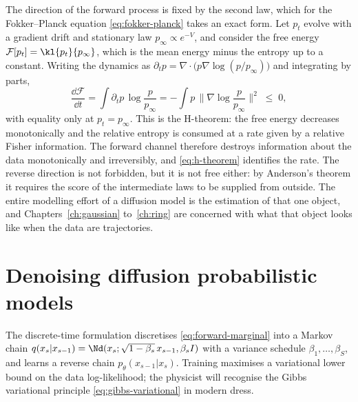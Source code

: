 The direction of the forward process is fixed by the second law, which for the
Fokker--Planck equation \eqref{eq:fokker-planck} takes an exact form. Let $p_t$
evolve with a gradient drift and stationary law $p_\infty \propto e^{-V}$, and
consider the free energy $\mathcal F[p_t] = \kl{p_t}{p_\infty}$, which is the
mean energy minus the entropy up to a constant. Writing the dynamics as
$\partial_t p = \nabla \cdot \big(p \nabla \log (p/p_\infty)\big)$ and
integrating by parts,
\begin{equation}
  \frac{\dd \mathcal F}{\dd t}
  = \int \partial_t p \, \log \frac{p}{p_\infty}
  = -\int p \,\Big\| \nabla \log \frac{p}{p_\infty} \Big\|^2 \;\le\; 0 ,
  \label{eq:h-theorem}
\end{equation}
with equality only at $p_t = p_\infty$. This is the H-theorem: the free energy
decreases monotonically and the relative entropy is consumed at a rate given by
a relative Fisher information. The forward channel therefore destroys
information about the data monotonically and irreversibly, and
\eqref{eq:h-theorem} identifies the rate. The reverse direction is not
forbidden, but it is not free either: by Anderson's theorem it requires the
score of the intermediate laws to be supplied from outside. The entire
modelling effort of a diffusion model is the estimation of that one object, and
Chapters~\ref{ch:gaussian} to~\ref{ch:ring} are concerned with what that object
looks like when the data are trajectories.

\section{Denoising diffusion probabilistic models}\label{sec:ddpm}

The discrete-time formulation \citep{sohl2015deep, ho2020denoising}
discretises \eqref{eq:forward-marginal} into a Markov chain
$q(x_s | x_{s-1}) = \Nd(x_s; \sqrt{1 - \beta_s}\, x_{s-1}, \beta_s I)$
with a variance schedule $\beta_1, \dots, \beta_S$, and learns a reverse
chain $p_\theta(x_{s-1} | x_s)$. Training maximises a variational lower
bound on the data log-likelihood; the physicist will recognise the Gibbs
variational principle \eqref{eq:gibbs-variational} in modern dress.

